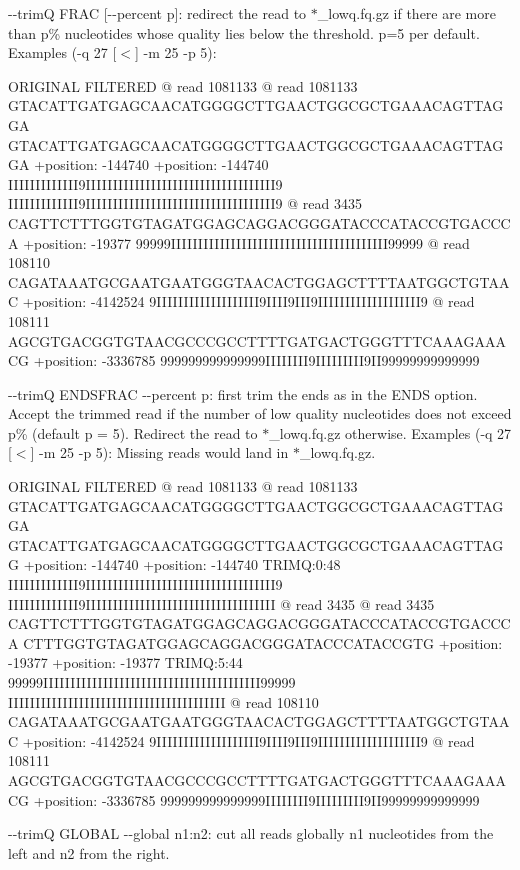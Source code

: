 \begin{DoxyItemize}
\item {\ttfamily -\/-\/trimQ F\+R\+AC \mbox{[}-\/-\/percent p\mbox{]}}\+: redirect the read to {\ttfamily $\ast$\+\_\+lowq.fq.\+gz} if there are more than {\ttfamily p\%} nucleotides whose quality lies below the threshold. {\ttfamily p=5} per default. Examples (-\/q 27 \mbox{[}$<$\mbox{]} -\/m 25 -\/p 5)\+: 
\begin{DoxyCode}
ORIGINAL                                            FILTERED
@ read 1081133                                      @ read 1081133
GTACATTGATGAGCAACATGGGGCTTGAACTGGCGCTGAAACAGTTAGGA  GTACATTGATGAGCAACATGGGGCTTGAACTGGCGCTGAAACAGTTAGGA
+position: -144740                                  +position: -144740
IIIIIIIIIIIII9IIIIIIIIIIIIIIIIIIIIIIIIIIIIIIIIIII9  IIIIIIIIIIIII9IIIIIIIIIIIIIIIIIIIIIIIIIIIIIIIIIII9
@ read 3435
CAGTTCTTTGGTGTAGATGGAGCAGGACGGGATACCCATACCGTGACCCA
+position: -19377
99999IIIIIIIIIIIIIIIIIIIIIIIIIIIIIIIIIIIIIIII99999
@ read 108110
CAGATAAATGCGAATGAATGGGTAACACTGGAGCTTTTAATGGCTGTAAC
+position: -4142524
9IIIIIIIIIIIIIIIIIII9IIII9III9IIIIIIIIIIIIIIIIIII9
@ read 108111
AGCGTGACGGTGTAACGCCCGCCTTTTGATGACTGGGTTTCAAAGAAACG
+position: -3336785
999999999999999IIIIIIII9IIIIIIIII9II99999999999999
\end{DoxyCode}

\item {\ttfamily -\/-\/trimQ E\+N\+D\+S\+F\+R\+AC -\/-\/percent p}\+: first trim the ends as in the {\ttfamily E\+N\+DS} option. Accept the trimmed read if the number of low quality nucleotides does not exceed {\ttfamily p\%} (default {\ttfamily p = 5}). Redirect the read to {\ttfamily $\ast$\+\_\+lowq.fq.\+gz} otherwise. Examples (-\/q 27 \mbox{[}$<$\mbox{]} -\/m 25 -\/p 5)\+: Missing reads would land in {\ttfamily $\ast$\+\_\+lowq.fq.\+gz}. 
\begin{DoxyCode}
ORIGINAL                                            FILTERED
@ read 1081133                                      @ read 1081133
GTACATTGATGAGCAACATGGGGCTTGAACTGGCGCTGAAACAGTTAGGA  GTACATTGATGAGCAACATGGGGCTTGAACTGGCGCTGAAACAGTTAGG
+position: -144740                                  +position: -144740 TRIMQ:0:48
IIIIIIIIIIIII9IIIIIIIIIIIIIIIIIIIIIIIIIIIIIIIIIII9  IIIIIIIIIIIII9IIIIIIIIIIIIIIIIIIIIIIIIIIIIIIIIIII
@ read 3435                                         @ read  3435
CAGTTCTTTGGTGTAGATGGAGCAGGACGGGATACCCATACCGTGACCCA  CTTTGGTGTAGATGGAGCAGGACGGGATACCCATACCGTG
+position: -19377                                   +position: -19377  TRIMQ:5:44
99999IIIIIIIIIIIIIIIIIIIIIIIIIIIIIIIIIIIIIIII99999  IIIIIIIIIIIIIIIIIIIIIIIIIIIIIIIIIIIIIIII
@ read 108110
CAGATAAATGCGAATGAATGGGTAACACTGGAGCTTTTAATGGCTGTAAC
+position: -4142524
9IIIIIIIIIIIIIIIIIII9IIII9III9IIIIIIIIIIIIIIIIIII9
@ read 108111
AGCGTGACGGTGTAACGCCCGCCTTTTGATGACTGGGTTTCAAAGAAACG
+position: -3336785
999999999999999IIIIIIII9IIIIIIIII9II99999999999999
\end{DoxyCode}

\item {\ttfamily -\/-\/trimQ G\+L\+O\+B\+AL -\/-\/global n1\+:n2}\+: cut all reads globally {\ttfamily n1} nucleotides from the left and {\ttfamily n2} from the right.
\end{DoxyItemize}

